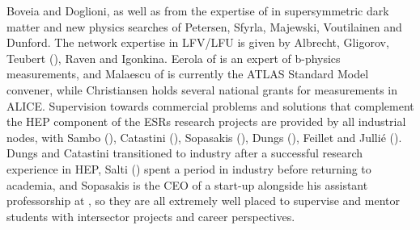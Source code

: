 Boveia and Doglioni, as well as from the expertise of in supersymmetric dark matter and new physics searches of Petersen, Sfyrla, 
Majewski, Voutilainen and Dunford. The network expertise in LFV/LFU is given by Albrecht, Gligorov, Teubert (\cernentity), Raven and Igonkina. 
Eerola of \helsinkientity is an expert of b-physics measurements,
and Malaescu of \cnrsentity is currently the ATLAS Standard Model convener, while Christiansen holds
several national grants for measurements in ALICE. 
%
Supervision towards commercial problems and solutions that complement the HEP component of the ESRs research projects 
are provided by all industrial nodes, with Sambo (\fleetmaticsentity), Catastini (\lightboxentity), Sopasakis (\ximantisentity), Dungs (\pointeightentity), 
Feillet and Julli\'{e} (\ibmentity). Dungs and Catastini transitioned to
industry after a successful research experience in HEP, Salti (\uniboentity) spent a period in industry before returning to academia, and Sopasakis is the CEO of a start-up alongside his
assistant professorship at \lundentity, so they are all extremely well placed to supervise and mentor students with intersector projects and career perspectives. 
%





